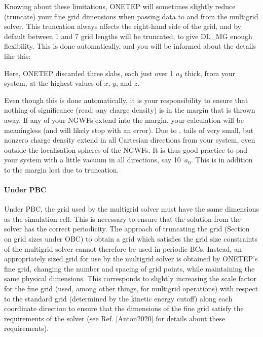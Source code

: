\documentclass[letterpaper,10pt,english]{sphinxmanual}
\begin{document}
Knowing about these limitations, ONETEP will sometimes slightly reduce
(truncate) your fine grid dimensions when passing data to and from the
multigrid solver. This truncation always affects the right-hand side of
the grid, and by default between 1 and 7 grid lengths will be truncated,
to give DL\_MG enough flexibility. This is done automatically, and you
will be informed about the details like this:

%
\begin{sphinxVerbatim}[commandchars=\\\{\}]
               
                  
\end{sphinxVerbatim}

Here, ONETEP discarded three slabs, each just over 1 \(a_0\) thick,
from your system, at the highest values of \(x\), \(y\), and
\(z\).

Even though this is done automatically, it is your responsibility to
ensure that nothing of significance (read: any charge density) is in the
margin that is thrown away. If any of your NGWFs extend into the margin,
your calculation will be meaningless (and will likely stop with an
error). Due to , tails of very small, but nonzero
charge density extend in all Cartesian directions from your system, even
outside the localisation spheres of the NGWFs. It is thus good practice
to pad your system with a little vacuum in all directions, say
10 \(a_0\). This is in addition to the margin lost due to
truncation.


\paragraph{Under PBC}
\label{\detokenize{implicit_solvation_v3:under-pbc}}
Under PBC, the grid used by the multigrid solver must have the same
dimensions as the simulation cell. This is necessary to ensure that the
solution from the solver has the correct periodicity. The approach of
truncating the grid (Section on grid sizes under OBC) to obtain a grid
which satisfies the grid size constraints of the multigrid solver cannot
therefore be used in periodic BCs. Instead, an appropriately sized grid
for use by the multigrid solver is obtained by  ONETEP’s fine
grid, changing the number and spacing of grid points, while maintaining
the same physical dimensions. This corresponds to slightly increasing
the scale factor for the fine grid (used, among other things, for
multigrid operations) with respect to the standard grid (determined by
the kinetic energy cutoff) along each coordinate direction to ensure
that the dimensions of the fine grid satisfy the requirements of the
solver (see Ref. {[}Anton2020{]} for details about these requirements).
\end{document}
